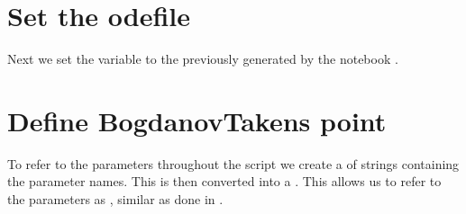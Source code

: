 \documentclass[letterpaper,10pt,english]{jupyterBook}
\begin{document}
\section{Set the odefile}
\label{\detokenize{BogdanovTakens:set-the-odefile}}
\sphinxAtStartPar
Next we set the variable  to the  previously generated by
the notebook {\hyperref[\detokenize{BogdanovTakensNormalFormGenSym::doc}]{}}.

\begin{sphinxVerbatim}[commandchars=\\\{\}]
\end{sphinxVerbatim}


\section{Define Bogdanov\sphinxhyphen{}Takens point}
\label{\detokenize{BogdanovTakens:define-bogdanov-takens-point}}
\begin{sphinxVerbatim}[commandchars=\\\{\}]
\PYG{p}{[}\PYG{p}{]}
\PYG{p}{[}\PYG{p}{]}
\end{sphinxVerbatim}

\sphinxAtStartPar
To refer to the parameters throughout the script we create a  of
strings containing the parameter names. This is then converted into a
. This allows us to refer to the parameters as ,
similar as done in .

\begin{sphinxVerbatim}[commandchars=\\\{\}]
\PYG{p}{[}\PYG{p}{]}
\end{sphinxVerbatim}
\end{document}
